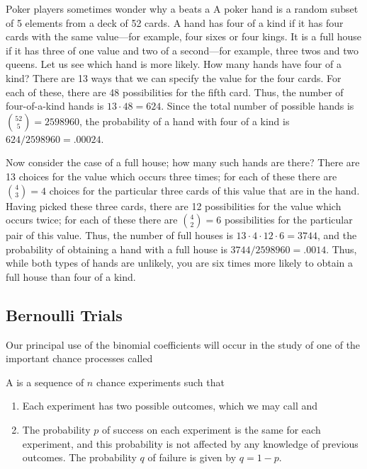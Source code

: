 \begin{example}\label{exam 3.8} Poker players sometimes wonder why a  beats a   A poker hand is a random subset of 5 elements from
a deck of 52 cards.  A hand has four of a kind if it has four cards with the same
value---for example, four sixes or four kings.  It is a full house if it has three of
one value and two of a second---for example, three twos and two queens.  Let us see
which hand is more likely.  How many hands have four of a kind?  There are 13 ways
that we can specify the value for the four cards.  For each of these, there are 48
possibilities for the fifth card.  Thus, the number of four-of-a-kind hands is $13
\cdot 48 = 624$.  Since the total number of possible hands is ${52 \choose 5} =
2598960$,  the probability of a hand with four of a kind is $624/2598960 = .00024$.
\par
Now consider the case of a full house; how many such hands are there?  There are 13
choices for the value which occurs three times; for each of these there are 
${4 \choose 3} = 4$ choices for the particular three cards of this value that are in
the hand.  Having picked these three cards, there are 12 possibilities for the value
which occurs twice; for each of these there are ${4 \choose 2} = 6$ possibilities for
the particular pair of this value.  Thus, the number of full houses is $13 \cdot 4
\cdot 12 \cdot 6 = 3744$, and the probability of obtaining a hand with a full house is
$3744/2598960 = .0014$.  Thus, while both types of hands are unlikely, you are six
times more likely to obtain a full house than four of a kind.
\end{example}
\pagebreak[4]
\subsection*{Bernoulli Trials}

Our principal use of the binomial coefficients will occur in the study of one of the
important chance processes called 

\begin{definition}\label{def 3.4} A  is a sequence of
$n$ chance experiments such that
\begin{enumerate}
\item Each experiment has two possible outcomes, which we may call  
and 
\item The probability $p$ of success on each experiment is the same for each
experiment, and this probability is not affected by any knowledge of previous
outcomes.  The probability $q$ of failure is given by $q = 1 - p$.
\end{enumerate}
\end{definition}

